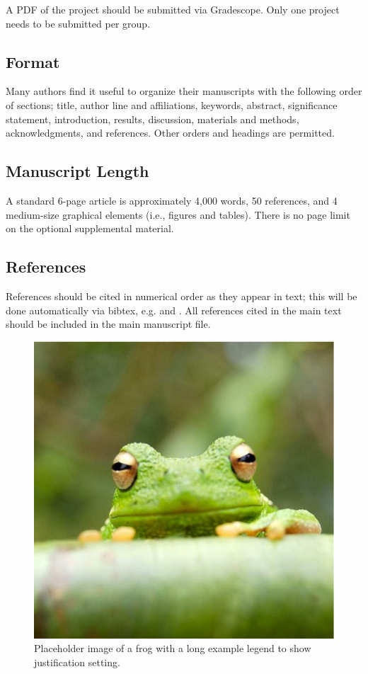 \documentclass[9pt,twoside]{pnas-new}
\begin{document}
A PDF of the project should be submitted via Gradescope. Only one project needs to be submitted per group.

\subsection*{Format}

Many authors find it useful to organize their manuscripts with the following order of sections; title, author line and affiliations, keywords, abstract, significance statement, introduction, results, discussion, materials and methods, acknowledgments, and references. Other orders and headings are permitted.

\subsection*{Manuscript Length}

A standard 6-page article is approximately 4,000 words, 50 references, and 4 medium-size graphical elements (i.e., figures and tables). There is no page limit on the optional supplemental material.

\subsection*{References}

References should be cited in numerical order as they appear in text; this will be done automatically via bibtex, e.g. \cite{belkin2002using} and \cite{berard1994embedding,coifman2005geometric}. All references cited in the main text should be included in the main manuscript file.

\begin{figure}%
\centering
\includegraphics[width=.8\linewidth]{Figures/frog.eps}
\caption{Placeholder image of a frog with a long example legend to show justification setting.}
\label{fig:frog}
\end{figure}
\end{document}
